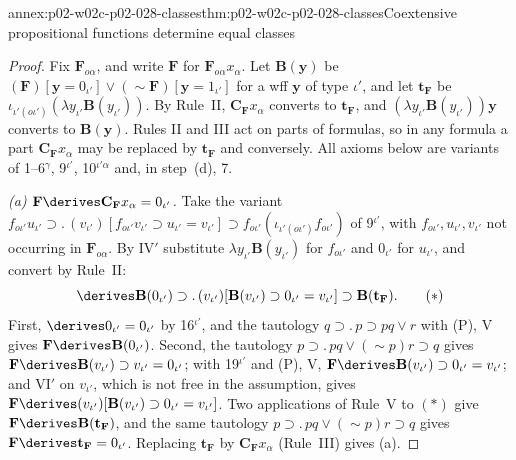 \begin{annexitem}{annex:p02-w02c-p02-028-classes}{thm:p02-w02c-p02-028-classes}{Coextensive propositional functions determine equal classes}
\begin{proof}
Fix \(\mathbf F_{o\alpha}\), and write \(\mathbf F\) for
\(\mathbf F_{o\alpha}x_\alpha\).  Let \(\mathbf B(\mathbf y)\) be
\((\mathbf F)[\mathbf y=0_{\iota'}]\vee(\sim\mathbf F)[\mathbf y=1_{\iota'}]\)
for a wff \(\mathbf y\) of type \(\iota'\), and let
\(\mathbf t_{\mathbf F}\) be
\(\iota_{\iota'(o\iota')}(\lambda y_{\iota'}\mathbf B(y_{\iota'}))\).  By
Rule~II, \(\mathbf C_{\mathbf F}x_\alpha\) converts to
\(\mathbf t_{\mathbf F}\), and \((\lambda y_{\iota'}\mathbf B(y_{\iota'}))\mathbf y\)
converts to \(\mathbf B(\mathbf y)\).  Rules II and III act on parts of
formulas, so in any formula a part \(\mathbf C_{\mathbf F}x_\alpha\) may be
replaced by \(\mathbf t_{\mathbf F}\) and conversely.  All axioms below are
variants of 1--6\(^\gamma\), 9\(^{\iota'}\), 10\(^{\iota'\alpha}\) and, in
step~(d), 7.

\emph{(a) \(\mathbf F\derives\mathbf C_{\mathbf F}x_\alpha=0_{\iota'}\).}
Take the variant
\(f_{o\iota'}u_{\iota'}\supset.\,(v_{\iota'})[f_{o\iota'}v_{\iota'}\supset u_{\iota'}=v_{\iota'}]
\supset f_{o\iota'}(\iota_{\iota'(o\iota')}f_{o\iota'})\) of 9\(^{\iota'}\),
with \(f_{o\iota'},u_{\iota'},v_{\iota'}\) not occurring in
\(\mathbf F_{o\alpha}\).  By IV\('\) substitute
\(\lambda y_{\iota'}\mathbf B(y_{\iota'})\) for \(f_{o\iota'}\) and
\(0_{\iota'}\) for \(u_{\iota'}\), and convert by Rule~II:
\[
 \derives\mathbf B(0_{\iota'})\supset.\,(v_{\iota'})[\mathbf B(v_{\iota'})\supset0_{\iota'}=v_{\iota'}]
 \supset\mathbf B(\mathbf t_{\mathbf F}).\tag{\(*\)}
\]
First, \(\derives0_{\iota'}=0_{\iota'}\) by 16\(^{\iota'}\), and the
tautology \(q\supset.\,p\supset pq\vee r\) with (P), V gives
\(\mathbf F\derives\mathbf B(0_{\iota'})\).  Second, the tautology
\(p\supset.\,pq\vee(\sim p)r\supset q\) gives
\(\mathbf F\derives\mathbf B(v_{\iota'})\supset v_{\iota'}=0_{\iota'}\);
with 19\(^{\iota'}\) and (P), V,
\(\mathbf F\derives\mathbf B(v_{\iota'})\supset0_{\iota'}=v_{\iota'}\); and
VI\('\) on \(v_{\iota'}\), which is not free in the assumption, gives
\(\mathbf F\derives(v_{\iota'})[\mathbf B(v_{\iota'})\supset0_{\iota'}=v_{\iota'}]\).
Two applications of Rule~V to \((*)\) give
\(\mathbf F\derives\mathbf B(\mathbf t_{\mathbf F})\), and the same
tautology \(p\supset.\,pq\vee(\sim p)r\supset q\) gives
\(\mathbf F\derives\mathbf t_{\mathbf F}=0_{\iota'}\).  Replacing
\(\mathbf t_{\mathbf F}\) by \(\mathbf C_{\mathbf F}x_\alpha\) (Rule~III)
gives (a).


\end{proof}
\end{annexitem}
